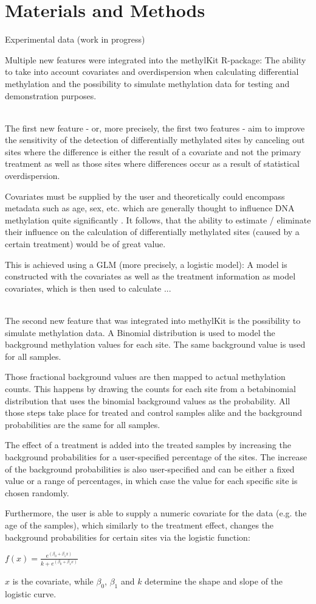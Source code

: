 \section{Materials and Methods}

Experimental data (work in progress)

Multiple new features were integrated into the methylKit R-package: The ability to take into account covariates and overdispersion when calculating differential methylation and the possibility to simulate methylation data for testing and demonstration purposes.

\\
The first new feature - or, more precisely, the first two features - aim to  improve the sensitivity of the detection of differentially methylated sites by canceling out sites where the difference is either the result of a covariate and not the primary treatment as well as those sites where differences occur as a result of statistical overdispersion.

Covariates must be supplied by the user and theoretically could encompass metadata such as age, sex, etc. which are generally thought to influence DNA methylation quite significantly \cite{24561809}. It follows, that the ability to estimate / eliminate their influence on the calculation of differentially methylated sites (caused by a certain treatment) would be of great value.

This is achieved using a GLM (more precisely, a logistic model): A model is constructed with the covariates as well as the treatment information as model covariates, which is then used to calculate ...

\\
The second new feature that was integrated into methylKit is the possibility to simulate methylation data.
A Binomial distribution is used to model the background methylation values for each site. The same background value is used for all samples.

Those fractional background values are then mapped to actual methylation counts. This happens by drawing the counts for each site from a betabinomial distribution that uses the binomial background values as the probability.
All those steps take place for treated and control samples alike and the background probabilities are the same for all samples.

The effect of a treatment is added into the treated samples by increasing the background probabilities for a user-specified percentage of the sites. The increase of the background probabilities is also user-specified and can be either a fixed value or a range of percentages, in which case the value for each specific site is chosen randomly.

Furthermore, the user is able to supply a numeric covariate for the data (e.g. the age of the samples), which similarly to the treatment effect, changes the background probabilities for certain sites via the logistic function:

$f(x) = \frac{e^{(\beta_{0} + \beta_{1}x)}}{k+e^{(\beta_{0} + \beta_{1}x)}}$

$x$ is the covariate, while $\beta_{0}$, $\beta_{1}$ and $k$ determine the shape and slope of the logistic curve.
  
  